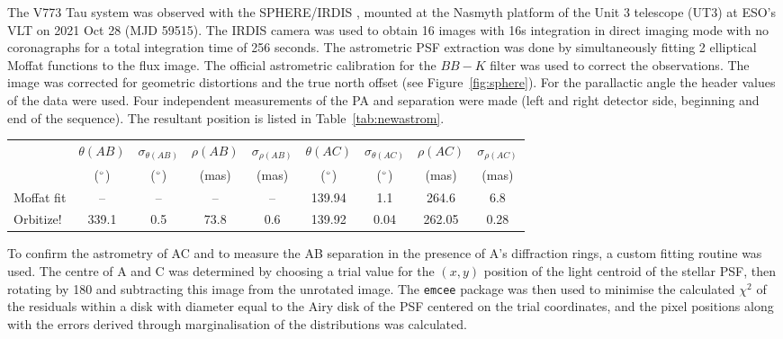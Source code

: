\documentclass{aa}
\begin{document}
The V773 Tau system was observed with the SPHERE/IRDIS \citep[Infra-Red Dual Imaging and Spectrograph; ][]{Beuzit19,Dohlen08}, mounted at the Nasmyth platform of the Unit 3 telescope (UT3) at ESO's VLT on 2021 Oct 28 (MJD 59515).
%
The IRDIS camera was used to obtain 16 images with 16s integration in direct imaging mode with no coronagraphs for a total integration time of 256 seconds.
%
The astrometric PSF extraction was done by simultaneously fitting 2 elliptical Moffat functions to the flux image.
%
The official astrometric calibration for the $BB-K$ filter \citep{Maire16} was used to correct the observations.
%
The image was corrected for geometric distortions and the true north offset (see Figure~\ref{fig:sphere}).
%
For the parallactic angle the header values of the data were used. 
%
Four independent measurements of the PA and separation were made (left and right detector side, beginning and end of the sequence). 
%
The resultant position is listed in Table~\ref{tab:newastrom}.

\begin{table*}
\caption{Orbital measurements for A, B and C.}              %
\label{tab:newastrom}      %
\centering                                      %
\begin{tabular}{l c c c c c c c c}          %
\hline\hline
 &     $\theta(AB)$ & $\sigma_{\theta(AB)}$ & $\rho(AB)$ & $\sigma_{\rho(AB)}$ & $\theta(AC)$ & $\sigma_{\theta(AC)}$ & $\rho(AC)$ & $\sigma_{\rho(AC)}$ \\
    &     ($^\circ$) & ($^\circ$)             & (mas)      & (mas)               & ($^\circ$)    & ($^\circ$)             & (mas)      & (mas)               \\
\hline
Moffat fit &     -- &                --     &   --       &  --                 & 139.94          & 1.1                   & 264.6      & 6.8                 \\
Orbitize!  &  339.1 & 0.5                   & 73.8       & 0.6                 & 139.92          & 0.04                  & 262.05     & 0.28                \\
\hline
\end{tabular}
\end{table*}

To confirm the astrometry of AC and to measure the AB separation in the presence of A's diffraction rings, a custom fitting routine was used.
%
The centre of A and C was determined by choosing a trial value for the $(x,y)$ position of the light centroid of the stellar PSF, then rotating by 180\degr{} and subtracting this image from the unrotated image.
%
The  {\tt emcee} package \citep{foreman-mackey2013} was then used to minimise the calculated $\chi^2$ of the residuals within a disk with diameter equal to the Airy disk of the PSF centered on the trial coordinates, and the pixel positions along with the errors derived through marginalisation of the distributions was calculated.
\end{document}
